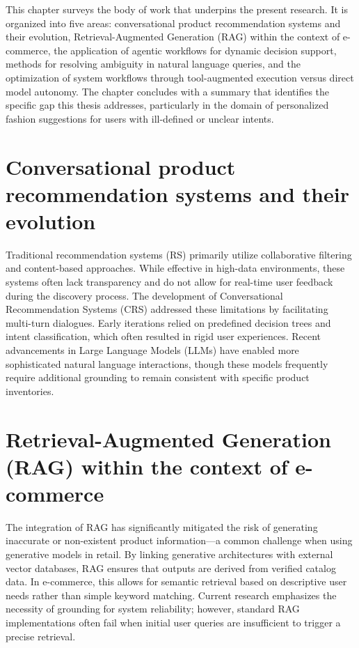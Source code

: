 This chapter surveys the body of work that underpins the present research. It is organized into five areas: conversational product recommendation systems and their evolution, Retrieval-Augmented Generation (RAG) within the context of e-commerce, the application of agentic workflows for dynamic decision support, methods for resolving ambiguity in natural language queries, and the optimization of system workflows through tool-augmented execution versus direct model autonomy. The chapter concludes with a summary that identifies the specific gap this thesis addresses, particularly in the domain of personalized fashion suggestions for users with ill-defined or unclear intents.
\section{Conversational product recommendation systems and their evolution}

Traditional recommendation systems (RS) primarily utilize collaborative filtering and content-based approaches. While effective in high-data environments, these systems often lack transparency and do not allow for real-time user feedback during the discovery process. The development of Conversational Recommendation Systems (CRS) addressed these limitations by facilitating multi-turn dialogues. Early iterations relied on predefined decision trees and intent classification, which often resulted in rigid user experiences. Recent advancements in Large Language Models (LLMs) have enabled more sophisticated natural language interactions, though these models frequently require additional grounding to remain consistent with specific product inventories.

\section{Retrieval-Augmented Generation (RAG) within the context of e-commerce}

The integration of RAG has significantly mitigated the risk of generating inaccurate or non-existent product information—a common challenge when using generative models in retail. By linking generative architectures with external vector databases, RAG ensures that outputs are derived from verified catalog data. In e-commerce, this allows for semantic retrieval based on descriptive user needs rather than simple keyword matching. Current research emphasizes the necessity of grounding for system reliability; however, standard RAG implementations often fail when initial user queries are insufficient to trigger a precise retrieval.

